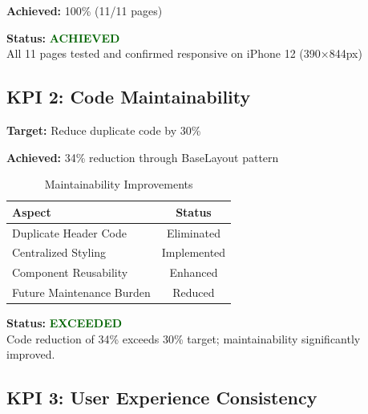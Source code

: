 \documentclass[11pt, a4paper]{report}
\begin{document}
\textbf{Achieved:} 100\% (11/11 pages)


\vspace{0.3cm}

\textbf{Status:} \textcolor{darkgreen}{\textbf{ACHIEVED}} \\
All 11 pages tested and confirmed responsive on iPhone 12 (390×844px)

\subsection{KPI 2: Code Maintainability}

\textbf{Target:} Reduce duplicate code by 30\%

\textbf{Achieved:} 34\% reduction through BaseLayout pattern

\begin{table}[H]
    \centering
    \caption{Maintainability Improvements}
    \begin{tabular}{|l|c|}
        \hline
        \textbf{Aspect} & \textbf{Status} \\
        \hline
        Duplicate Header Code & Eliminated \\
        Centralized Styling & Implemented \\
        Component Reusability & Enhanced \\
        Future Maintenance Burden & Reduced \\
        \hline
    \end{tabular}
\end{table}

\textbf{Status:} \textcolor{darkgreen}{\textbf{EXCEEDED}} \\
Code reduction of 34\% exceeds 30\% target; maintainability significantly improved.

\subsection{KPI 3: User Experience Consistency}
\end{document}
